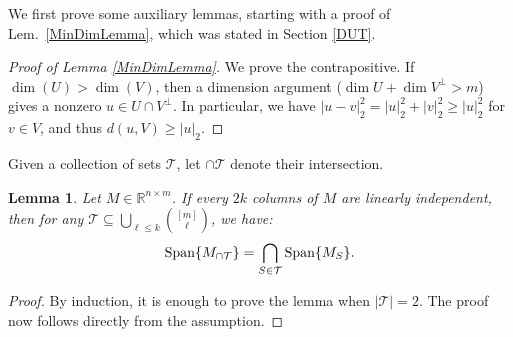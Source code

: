 \documentclass[journal, twocolumn]{IEEEtran}
\newtheorem{lemma}{Lemma}
\begin{document}
We first prove some auxiliary lemmas, starting with a proof of Lem.~\ref{MinDimLemma}, which was stated in Section \ref{DUT}. 
\begin{proof}[Proof of Lemma \ref{MinDimLemma}]
We prove the contrapositive.  If $\dim(U) > \dim(V)$, then a dimension argument ($\dim U + \dim V^\perp > m$) gives a nonzero $u \in U \cap V^\perp$.  In particular, we have $|u - v|_2^2 = |u|_2^2 + |v|_2^2 \geq |u|_2^2$ for $v \in V$, and thus $d(u,V) \geq |u|_2$.
\end{proof}

Given a collection of sets $\mathcal{T}$, let $\cap \mathcal{T}$ denote their intersection.
\begin{lemma}\label{SpanIntersectionLemma}
Let $M \in \mathbb{R}^{n \times m}$. If every $2k$ columns of $M$ are linearly independent, then for any $\mathcal{T} \subseteq \bigcup_{\ell \leq k} {[m] \choose \ell}$, we have:
\begin{align*}
\text{\rm Span}\{M_{\cap \mathcal{T}}\}  = \bigcap_{S \in \mathcal{T}} \text{\rm Span}\{M_S\}.
\end{align*}
\end{lemma}

\begin{proof}By induction, it is enough to prove the lemma when $|\mathcal{T}| = 2$. The proof now follows directly from the assumption.
\end{proof}


\end{document}
